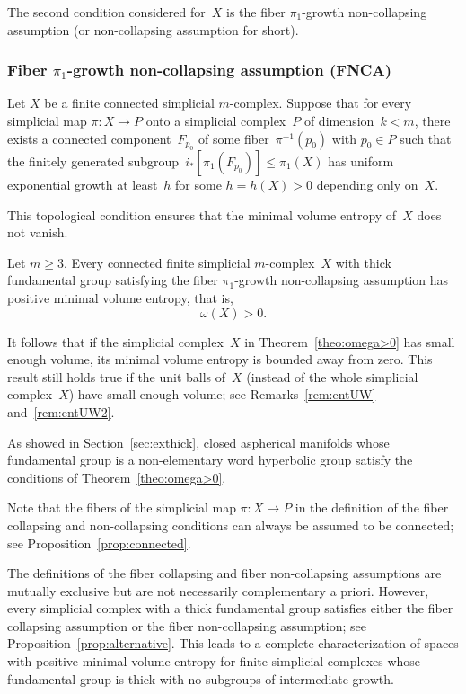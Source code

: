 The second condition considered for~$X$ is the fiber $\pi_1$-growth non-collapsing assumption (or non-collapsing assumption for short).

\subsubsection*{Fiber $\pi_1$-growth non-collapsing assumption (FNCA)}
Let $X$ be a finite connected simplicial $m$\nobreakdash-complex.
Suppose that for every simplicial map \mbox{$\pi:X \to P$} onto a simplicial complex~$P$ of dimension~$k<m$, there exists a connected component~$F_{p_0}$ of some fiber~$\pi^{-1}(p_0)$ with $p_0 \in P$ such that the finitely generated subgroup~$i_*[\pi_1(F_{p_0})] \leqslant \pi_1(X)$ has uniform exponential growth at least~$h$ for some $h=h(X)>0$ depending only on~$X$.

This topological condition ensures that the minimal volume entropy of~$X$ does not vanish.

\begin{theorem} \label{theo:omega>0}
Let $m \geq 3$.
Every connected finite simplicial $m$\nobreakdash-complex~$X$ with thick fundamental group satisfying the fiber $\pi_1$-growth non-collapsing assumption has positive minimal volume entropy, that is,
\[
\omega(X) > 0.
\]
\end{theorem}

It follows that if the simplicial complex~$X$ in Theorem~\ref{theo:omega>0} has small enough volume, its minimal volume entropy is bounded away from zero.
This result still holds true if the unit balls of~$X$ (instead of the whole simplicial complex~$X$) have small enough volume; see Remarks~\ref{rem:entUW} and~\ref{rem:entUW2}.

As showed in Section~\ref{sec:exthick}, closed aspherical manifolds whose fundamental group is a non-elementary word hyperbolic group satisfy the conditions of Theorem~\ref{theo:omega>0}.

\begin{remark}
Note that the fibers of the simplicial map $\pi:X \to P$ in the definition of the fiber collapsing and non-collapsing conditions can always be assumed to be connected; see Proposition~\ref{prop:connected}.
\end{remark}

The definitions of the fiber collapsing and fiber non-collapsing assumptions are mutually exclusive but are not necessarily complementary a priori.
However, every simplicial complex with a thick fundamental group satisfies either the fiber collapsing assumption or the fiber non-collapsing assumption; see Proposition~\ref{prop:alternative}.
This leads to a complete characterization of spaces with positive minimal volume entropy for finite simplicial complexes whose fundamental group is thick with no subgroups of intermediate growth.

